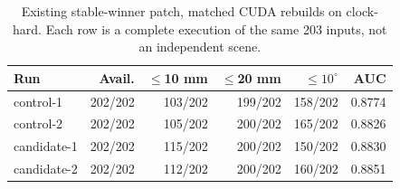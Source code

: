\begin{table}[t]\centering\scriptsize
\caption{Existing stable-winner patch, matched CUDA rebuilds on clock-hard. Each row is a complete execution of the same 203 inputs, not an independent scene.}
\label{tab:bt-winner}
\begin{tabular}{lrrrrr}\toprule
Run & Avail. & $\leq$10 mm & $\leq$20 mm & $\leq10^\circ$ & AUC\\\midrule
control-1 & 202/202 & 103/202 & 199/202 & 158/202 & 0.8774\\
control-2 & 202/202 & 105/202 & 200/202 & 165/202 & 0.8826\\
candidate-1 & 202/202 & 115/202 & 200/202 & 150/202 & 0.8830\\
candidate-2 & 202/202 & 112/202 & 200/202 & 160/202 & 0.8851\\
\bottomrule\end{tabular}\end{table}
